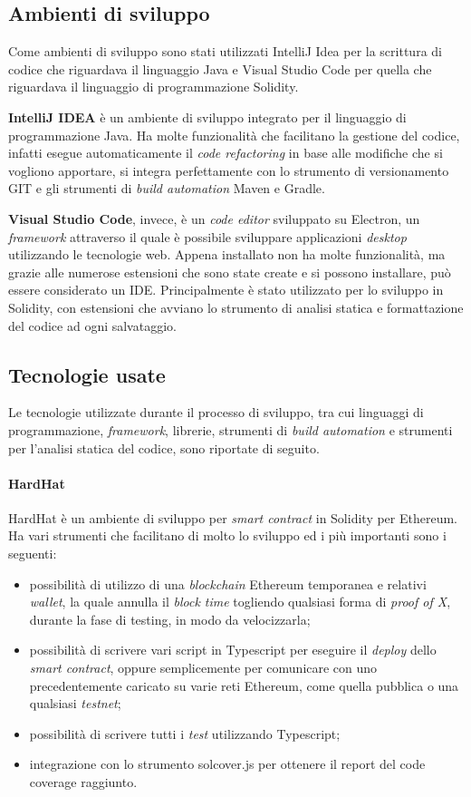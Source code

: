 \subsection{Ambienti di sviluppo}
Come ambienti di sviluppo sono stati utilizzati IntelliJ Idea per la scrittura di codice che riguardava il linguaggio Java e Visual Studio Code per quella che riguardava il linguaggio di programmazione Solidity.

\textbf{IntelliJ IDEA} è un ambiente di sviluppo integrato per il linguaggio di programmazione Java. Ha molte funzionalità che facilitano la gestione del codice, infatti esegue automaticamente il \textit{code refactoring} in base alle modifiche che si vogliono apportare, si integra perfettamente con lo strumento di versionamento GIT e gli strumenti di \textit{build automation} Maven e Gradle.

\textbf{Visual Studio Code}, invece, è un \textit{code editor} sviluppato su Electron, un \textit{framework} attraverso il quale è possibile sviluppare applicazioni \textit{desktop} utilizzando le tecnologie web. Appena installato non ha molte funzionalità, ma grazie alle numerose estensioni che sono state create e si possono installare, può essere considerato un IDE. Principalmente è stato utilizzato per lo sviluppo in Solidity, con estensioni che avviano lo strumento di analisi statica e formattazione del codice ad ogni salvataggio.

\subsection{Tecnologie usate}
Le tecnologie utilizzate durante il processo di sviluppo, tra cui linguaggi di programmazione, \textit{framework}, librerie, strumenti di \textit{build automation} e strumenti per l'analisi statica del codice, sono riportate di seguito.

\paragraph{HardHat}
HardHat è un ambiente di sviluppo per \textit{smart contract} in Solidity per Ethereum. Ha vari strumenti che facilitano di molto lo sviluppo ed i più importanti sono i seguenti:
\begin{itemize}
  \item possibilità di utilizzo di una \textit{blockchain} Ethereum temporanea e relativi \textit{wallet}, la quale annulla il \textit{block time} togliendo qualsiasi forma di \textit{proof of X}, durante la fase di testing, in modo da velocizzarla;
  \item possibilità di scrivere vari script in Typescript per eseguire il \textit{deploy} dello \textit{smart contract}, oppure semplicemente per comunicare con uno precedentemente caricato su varie reti Ethereum, come quella pubblica o una qualsiasi \textit{testnet};
  \item possibilità di scrivere tutti i \textit{test} utilizzando Typescript;
  \item integrazione con lo strumento solcover.js per ottenere il report del code coverage raggiunto.
\end{itemize}

